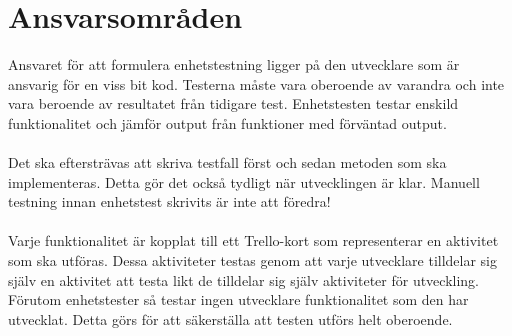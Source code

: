 \section{Ansvarsområden}
Ansvaret för att formulera enhetstestning ligger på den utvecklare som är ansvarig för en viss bit kod. Testerna måste vara oberoende av varandra och inte vara beroende av resultatet från tidigare test. Enhetstesten testar enskild funktionalitet och jämför output från funktioner med förväntad output.\\
\\
Det ska eftersträvas att skriva testfall först och sedan metoden som ska implementeras. Detta gör det också tydligt när utvecklingen är klar. Manuell testning innan enhetstest skrivits är inte att föredra!\\
\\
Varje funktionalitet är kopplat till ett Trello-kort som representerar en aktivitet som ska utföras. Dessa aktiviteter testas genom att varje utvecklare tilldelar sig själv en aktivitet att testa likt de tilldelar sig själv aktiviteter för utveckling. Förutom enhetstester så testar ingen utvecklare funktionalitet som den har utvecklat. Detta görs för att säkerställa att testen utförs helt oberoende.